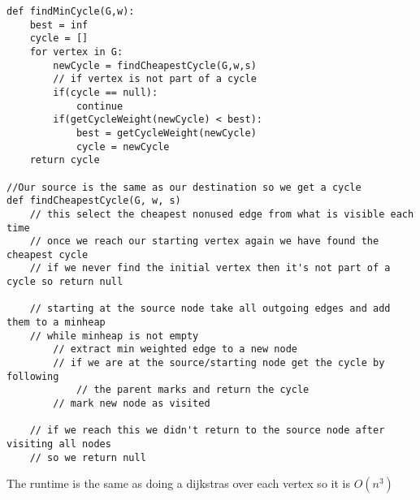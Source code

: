 \documentclass{article}
\begin{document}
\begin{lstlisting}
def findMinCycle(G,w):
    best = inf
    cycle = []
    for vertex in G:
        newCycle = findCheapestCycle(G,w,s)
        // if vertex is not part of a cycle
        if(cycle == null):
            continue
        if(getCycleWeight(newCycle) < best):
            best = getCycleWeight(newCycle)
            cycle = newCycle
    return cycle

//Our source is the same as our destination so we get a cycle
def findCheapestCycle(G, w, s)
    // this select the cheapest nonused edge from what is visible each time
    // once we reach our starting vertex again we have found the cheapest cycle
    // if we never find the initial vertex then it's not part of a cycle so return null

    // starting at the source node take all outgoing edges and add them to a minheap
    // while minheap is not empty
        // extract min weighted edge to a new node
        // if we are at the source/starting node get the cycle by following
            // the parent marks and return the cycle
        // mark new node as visited

    // if we reach this we didn't return to the source node after visiting all nodes
    // so we return null

\end{lstlisting}

The runtime is the same as doing a dijkstras over each vertex so it is $O(n^3)$
\end{document}
